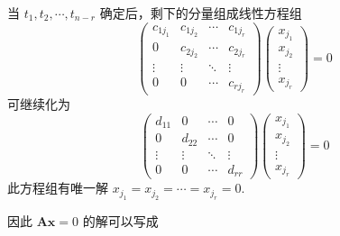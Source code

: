 \documentclass[11pt,letter,notitlepage]{article}
\begin{document}
\begin{solution}
\begin{enumerate}
\begin{enumerate}
			            当 $t_1, t_2, \cdots, t_{n-r}$ 确定后，剩下的分量组成线性方程组
			            $$\begin{pmatrix}
					            c_{1 j_1} & c_{1 j_2} & \cdots & c_{1 j_r} \\
					            0         & c_{2 j_2} & \cdots & c_{2 j_r} \\
					            \vdots    & \vdots    & \ddots & \vdots    \\
					            0         & 0         & \cdots & c_{r j_r}
				            \end{pmatrix}
				            \begin{pmatrix}
					            x_{j_1} \\ x_{j_2}\\ \vdots\\ x_{j_r}
				            \end{pmatrix}=0$$
			            可继续化为
			            $$\begin{pmatrix}
					            d_{11} & 0      & \cdots & 0      \\
					            0      & d_{22} & \cdots & 0      \\
					            \vdots & \vdots & \ddots & \vdots \\
					            0      & 0      & \cdots & d_{rr}
				            \end{pmatrix}
				            \begin{pmatrix}
					            x_{j_1} \\ x_{j_2}\\ \vdots\\ x_{j_r}
				            \end{pmatrix}=0$$
			            此方程组有唯一解 $x_{j_1}=x_{j_2}=\cdots=x_{j_r}=0$.

			            因此 $\mathbf{Ax}=0$ 的解可以写成


\end{enumerate}
\end{enumerate}
\end{solution}
\end{document}
